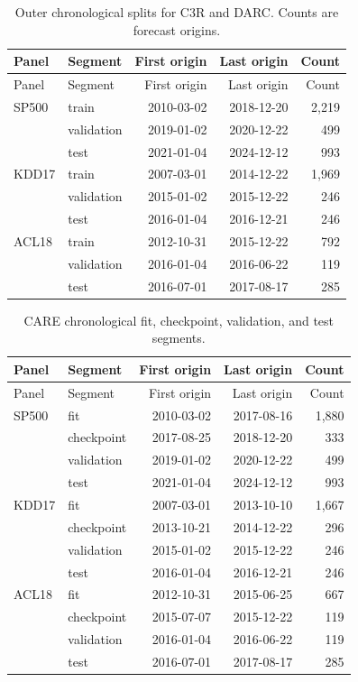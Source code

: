 \documentclass[10pt]{article}
\begin{document}
\begin{longtable}{llrrr}
\caption{Outer chronological splits for C3R and DARC. Counts are forecast origins.}\\
\toprule
Panel & Segment & First origin & Last origin & Count \\
\midrule\endfirsthead
\toprule Panel & Segment & First origin & Last origin & Count \\ \midrule\endhead
SP500 & train & 2010-03-02 & 2018-12-20 & 2,219 \\
 & validation & 2019-01-02 & 2020-12-22 & 499 \\
 & test & 2021-01-04 & 2024-12-12 & 993 \\
KDD17 & train & 2007-03-01 & 2014-12-22 & 1,969 \\
 & validation & 2015-01-02 & 2015-12-22 & 246 \\
 & test & 2016-01-04 & 2016-12-21 & 246 \\
ACL18 & train & 2012-10-31 & 2015-12-22 & 792 \\
 & validation & 2016-01-04 & 2016-06-22 & 119 \\
 & test & 2016-07-01 & 2017-08-17 & 285 \\
\bottomrule
\end{longtable}

\begin{longtable}{llrrr}
\caption{CARE chronological fit, checkpoint, validation, and test segments.}\\
\toprule
Panel & Segment & First origin & Last origin & Count \\
\midrule\endfirsthead
\toprule Panel & Segment & First origin & Last origin & Count \\ \midrule\endhead
SP500 & fit & 2010-03-02 & 2017-08-16 & 1,880 \\
 & checkpoint & 2017-08-25 & 2018-12-20 & 333 \\
 & validation & 2019-01-02 & 2020-12-22 & 499 \\
 & test & 2021-01-04 & 2024-12-12 & 993 \\
KDD17 & fit & 2007-03-01 & 2013-10-10 & 1,667 \\
 & checkpoint & 2013-10-21 & 2014-12-22 & 296 \\
 & validation & 2015-01-02 & 2015-12-22 & 246 \\
 & test & 2016-01-04 & 2016-12-21 & 246 \\
ACL18 & fit & 2012-10-31 & 2015-06-25 & 667 \\
 & checkpoint & 2015-07-07 & 2015-12-22 & 119 \\
 & validation & 2016-01-04 & 2016-06-22 & 119 \\
 & test & 2016-07-01 & 2017-08-17 & 285 \\
\bottomrule
\end{longtable}
\end{document}
